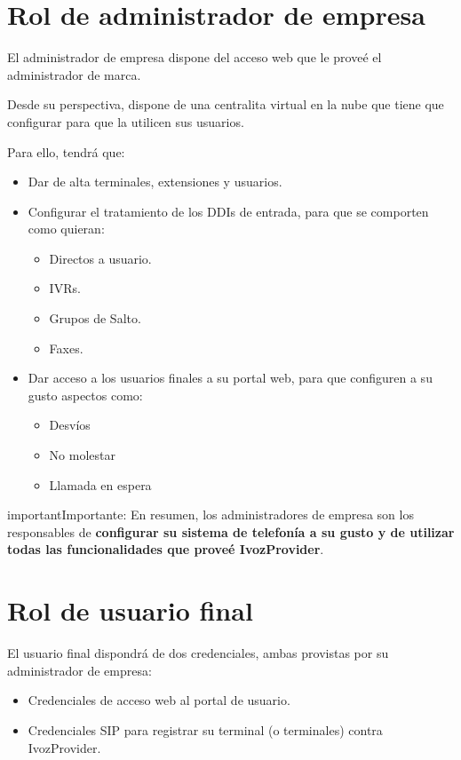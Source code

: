 \documentclass[letterpaper,10pt,spanish]{sphinxmanual}
\begin{document}
\section{Rol de administrador de empresa}
\label{operation_roles/index:rol-de-administrador-de-empresa}
El administrador de empresa dispone del acceso web que le proveé el administrador de marca.

Desde su perspectiva, dispone de una centralita virtual en la nube que tiene que configurar para que la utilicen sus usuarios.

Para ello, tendrá que:
\begin{itemize}
\item {} 
Dar de alta terminales, extensiones y usuarios.

\item {} 
Configurar el tratamiento de los DDIs de entrada, para que se comporten como quieran:
\begin{itemize}
\item {} 
Directos a usuario.

\item {} 
IVRs.

\item {} 
Grupos de Salto.

\item {} 
Faxes.

\end{itemize}

\item {} 
Dar acceso a los usuarios finales a su portal web, para que configuren a su gusto aspectos como:
\begin{itemize}
\item {} 
Desvíos

\item {} 
No molestar

\item {} 
Llamada en espera

\end{itemize}

\end{itemize}

\begin{notice}{important}{Importante:}
En resumen, los administradores de empresa son los responsables de \textbf{configurar su sistema de telefonía a su gusto y de utilizar todas las funcionalidades que proveé IvozProvider}.
\end{notice}


\section{Rol de usuario final}
\label{operation_roles/index:rol-de-usuario-final}
El usuario final dispondrá de dos credenciales, ambas provistas por su administrador de empresa:
\begin{itemize}
\item {} 
Credenciales de acceso web al portal de usuario.

\item {} 
Credenciales SIP para registrar su terminal (o terminales) contra IvozProvider.

\end{itemize}
\end{document}
